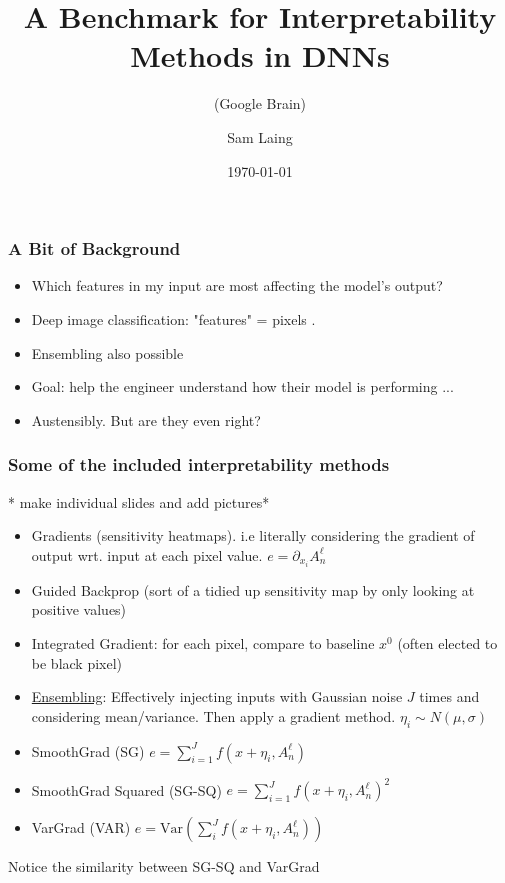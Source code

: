 \documentclass{beamer}
\theoremstyle{mystyle}
\begin{document}
\title{A Benchmark for Interpretability Methods in DNNs}
\subtitle{(Google Brain)}
\author{Sam Laing }
\date{\today}
\begin{frame}
\titlepage
\end{frame}
\begin{frame}
	\frametitle{A Bit of Background}
	\begin{itemize}
		\item Which features in my input are most affecting the model's output?\pause
		\item Deep image classification: "features" = pixels .\pause
		\item Ensembling also possible \pause
		\item Goal: help the engineer understand how their model is performing ... \pause 
		\item Austensibly. But are they even right?
	\end{itemize}
\end{frame}
\begin{frame}
	\frametitle{Some of the included interpretability methods}

	* make individual slides and add pictures*
\begin{itemize}
	\item Gradients (sensitivity heatmaps). i.e literally considering the gradient of output wrt. input at each pixel value.  $e = \partial_{x_i} A_n^{\ell} $

\item Guided Backprop (sort of a tidied up sensitivity map by only looking at positive values)
\item Integrated Gradient: for each pixel, compare to baseline $x^0$ (often elected to be black pixel)  \\

\item \underline{Ensembling}: Effectively injecting inputs with Gaussian noise $J$ times and considering mean/variance. Then apply a gradient method. $\eta_i \sim N(\mu , \sigma )$
\item SmoothGrad (SG) $e = \sum_{i=1}^{J} {f( x + \eta_i, A_n^{\ell}) }$
\item SmoothGrad Squared (SG-SQ) $e = \sum_{i=1}^{J} {f( x + \eta_i, A_n^{\ell})^{2} }$
\item VarGrad (VAR) $e = \text{Var}\left(  \sum_{i}^{J} {f(x + \eta_i, A_n^{\ell})}\right) $
\end{itemize}
Notice the similarity between SG-SQ and VarGrad
\end{frame}
\end{document}
